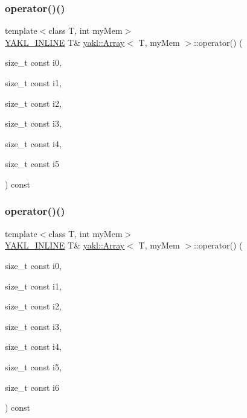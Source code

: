 \subsubsection{\texorpdfstring{operator()()}{operator()()}\hspace{0.1cm}{\footnotesize\ttfamily [6/8]}}
{\footnotesize\ttfamily template$<$class T, int my\+Mem$>$ \\
\hyperlink{YAKL_8h_aa0dd629ffce6d564b19e9313fb91a5ad}{Y\+A\+K\+L\+\_\+\+I\+N\+L\+I\+NE} T\& \hyperlink{classyakl_1_1Array}{yakl\+::\+Array}$<$ T, my\+Mem $>$\+::operator() (\begin{DoxyParamCaption}\item[{size\+\_\+t const}]{i0,  }\item[{size\+\_\+t const}]{i1,  }\item[{size\+\_\+t const}]{i2,  }\item[{size\+\_\+t const}]{i3,  }\item[{size\+\_\+t const}]{i4,  }\item[{size\+\_\+t const}]{i5 }\end{DoxyParamCaption}) const\hspace{0.3cm}{\ttfamily [inline]}}

\mbox{\label{classyakl_1_1Array_a8c757674535e63eee86158d0bd4eb252}} 
\subsubsection{\texorpdfstring{operator()()}{operator()()}\hspace{0.1cm}{\footnotesize\ttfamily [7/8]}}
{\footnotesize\ttfamily template$<$class T, int my\+Mem$>$ \\
\hyperlink{YAKL_8h_aa0dd629ffce6d564b19e9313fb91a5ad}{Y\+A\+K\+L\+\_\+\+I\+N\+L\+I\+NE} T\& \hyperlink{classyakl_1_1Array}{yakl\+::\+Array}$<$ T, my\+Mem $>$\+::operator() (\begin{DoxyParamCaption}\item[{size\+\_\+t const}]{i0,  }\item[{size\+\_\+t const}]{i1,  }\item[{size\+\_\+t const}]{i2,  }\item[{size\+\_\+t const}]{i3,  }\item[{size\+\_\+t const}]{i4,  }\item[{size\+\_\+t const}]{i5,  }\item[{size\+\_\+t const}]{i6 }\end{DoxyParamCaption}) const\hspace{0.3cm}{\ttfamily [inline]}}

